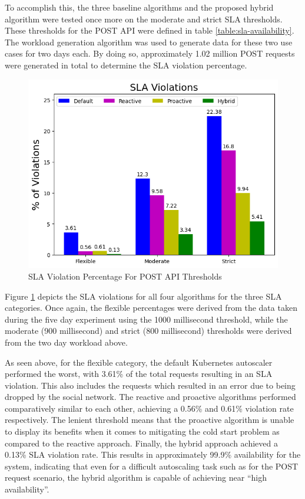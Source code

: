To accomplish this, the three baseline algorithms and the proposed hybrid algorithm were tested once more on the moderate and strict SLA thresholds. These thresholds for the POST API were defined in table \ref{table:sla-availability}. The workload generation algorithm was used to generate data for these two use cases for two days each. By doing so, approximately 1.02 million POST requests were generated in total to determine the SLA violation percentage.\par

\begin{figure}[htb]
    \centering
    \caption{SLA Violation Percentage For POST API Thresholds}
    \label{fig:exp2-sla-violation-bar}
    \includegraphics[width=0.6\linewidth]{Figures/Compose-Post-SLA-Violations.png}
\end{figure}

Figure \ref{fig:exp2-sla-violation-bar} depicts the SLA violations for all four algorithms for the three SLA categories. Once again, the flexible percentages were derived from the data taken during the five day experiment using the 1000 millisecond threshold, while the moderate (900 millisecond) and strict (800 millisecond) thresholds were derived from the two day workload above.\par

As seen above, for the flexible category, the default Kubernetes autoscaler performed the worst, with 3.61\% of the total requests resulting in an SLA violation. This also includes the requests which resulted in an error due to being dropped by the social network. The reactive and proactive algorithms performed comparatively similar to each other, achieving a 0.56\% and 0.61\% violation rate respectively. The lenient threshold means that the proactive algorithm is unable to display its benefits when it comes to mitigating the cold start problem as compared to the reactive approach. Finally, the hybrid approach achieved a 0.13\% SLA violation rate. This results in approximately 99.9\% availability for the system, indicating that even for a difficult autoscaling task such as for the POST request scenario, the hybrid algorithm is capable of achieving near ``high availability''.\par

